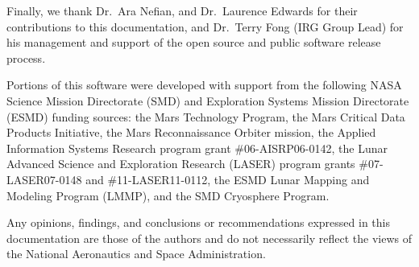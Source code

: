Finally, we thank Dr.~Ara Nefian, and Dr.~Laurence Edwards for their
contributions to this documentation, and Dr.~Terry Fong (IRG Group
Lead) for his management and support of the open source and public
software release process.

Portions of this software were developed with support from the
following NASA Science Mission Directorate (SMD) and Exploration
Systems Mission Directorate (ESMD) funding sources: the Mars
Technology Program, the Mars Critical Data Products Initiative, the
Mars Reconnaissance Orbiter mission, the Applied Information Systems
Research program grant \#06-AISRP06-0142, the Lunar Advanced Science
and Exploration Research (LASER) program grants \#07-LASER07-0148 and
\#11-LASER11-0112, the ESMD Lunar Mapping and Modeling Program (LMMP),
and the SMD Cryosphere Program.

Any opinions, findings, and conclusions or recommendations expressed
in this documentation are those of the authors and do not necessarily
reflect the views of the National Aeronautics and Space Administration.
